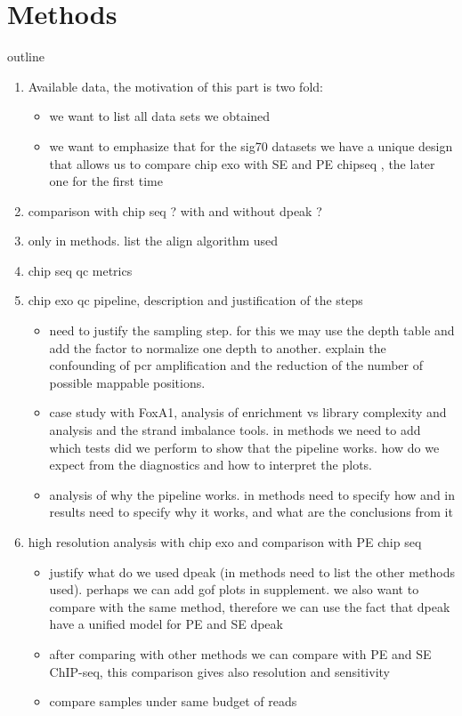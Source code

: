 \documentclass{bmcart}\usepackage[]{graphicx}\usepackage[]{color}
\begin{document}
\section{Methods}
\label{sec:methods}




outline

\begin{enumerate}
\item Available data, the motivation of this part is two fold:
  \begin{itemize}
  \item we want to list all data sets we obtained
  \item we want to emphasize that for the sig70 datasets we have a
    unique design that allows us to compare chip exo with SE and PE
    chipseq , the later one for the first time
  \end{itemize}
\item comparison with chip seq ? with and without dpeak ?
\item only in methods. list the align algorithm used
\item chip seq qc metrics
\item chip exo qc pipeline, description and justification of the steps
\begin{itemize}
\item need to justify the sampling step. for this we may use the depth
  table and add the factor to normalize one depth to another. explain
  the confounding of pcr amplification and the reduction of the number
  of possible mappable positions.
\item case study with FoxA1, analysis of enrichment vs library
  complexity and analysis and the strand imbalance tools. in methods
  we need to add which tests did we perform to show that the pipeline
  works. how do we expect from the diagnostics and how to interpret
  the plots.
\item analysis of why the pipeline works. in methods need to specify
  how and in results need to specify why it works, and what are the
  conclusions from it
\end{itemize}
\item high resolution analysis with chip exo and comparison with PE
  chip seq
  \begin{itemize}
  \item justify what do we used dpeak (in methods need to list the
    other methods used). perhaps we can add gof plots in
    supplement. we also want to compare with the same method,
    therefore we can use the fact that dpeak have a unified model for
    PE and SE dpeak
  \item after comparing with other methods we can compare with PE and
    SE ChIP-seq, this comparison gives also resolution and sensitivity
  \item compare samples under same budget of reads
  \end{itemize} 
\end{enumerate}
\end{document}
